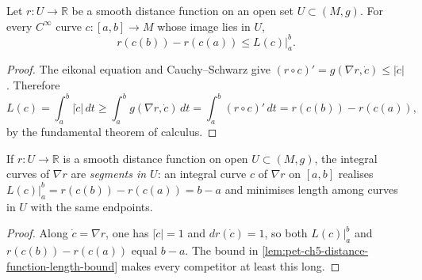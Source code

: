 \begin{lemma}
  \label{lem:pet-ch5-distance-function-length-bound}


  Let $r:U\to\mathbb R$ be a smooth distance function on an open set
  $U\subset(M,g)$. For every $C^\infty$ curve $c:[a,b]\to M$ whose image lies in
  $U$,
  \[
    r(c(b))-r(c(a))\le L(c)|_a^b.
  \]
\end{lemma}
\begin{proof}

  \sketch
  The eikonal equation and Cauchy--Schwarz give
  $(r\circ c)'=g(\nabla r,\dot c)\le|\dot c|$. Therefore
  \[
    L(c)=\int_a^b|\dot c|\,dt\ge\int_a^b g(\nabla r,\dot c)\,dt
      =\int_a^b (r\circ c)'\,dt=r(c(b))-r(c(a)),
  \]
    by the fundamental theorem of calculus.
\end{proof}

\begin{lemma}
  \label{lem:pet-ch5-distance-function-segments}


  If $r:U\to\mathbb R$ is a smooth distance function on open $U\subset(M,g)$, the
  integral curves of $\nabla r$ are \emph{segments in $U$}: an integral curve $c$
  of $\nabla r$ on $[a,b]$ realises $L(c)|_a^b=r(c(b))-r(c(a))=b-a$ and minimises
  length among curves in $U$ with the same endpoints.
\end{lemma}
\begin{proof}

  \sketch
  Along $\dot c=\nabla r$, one has $|\dot c|=1$ and $dr(\dot c)=1$, so both
  $L(c)|_a^b$ and $r(c(b))-r(c(a))$ equal $b-a$.  The bound in
  \cref{lem:pet-ch5-distance-function-length-bound} makes every competitor at
  least this long.
\end{proof}

